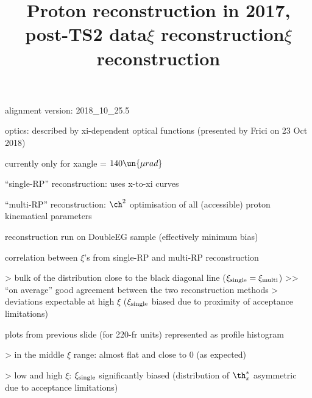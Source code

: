 


\newpage %

\def\author{J.~Kašpar}
\def\caption{Proton reconstruction, 2017, post-TS2}
\def\date{26 Oct 2018}

\newpage %
\title{Proton reconstruction in 2017, post-TS2 data}

\> alignment version: 2018\_10\_25.5

\> optics: described by xi-dependent optical functions (presented by Frici on 23 Oct 2018)

\> currently only for xangle = $140\un{\mu rad}$

\> ``single-RP'' reconstruction: uses x-to-xi curves

\> ``multi-RP'' reconstruction: $\ch^2$ optimisation of all (accessible) proton kinematical parameters

\> reconstruction run on DoubleEG sample (effectively minimum bias)



\newpage %
\title{$\xi$ reconstruction}

\> correlation between $\xi$'s from single-RP and multi-RP reconstruction

\centerline{}

\>> bulk of the distribution close to the black diagonal line ($\xi_{\rm single} = \xi_{\rm multi}$)
\>>> ``on average'' good agreement between the two reconstruction methods
\>> deviations expectable at high $\xi$ ($\xi_{\rm single}$ biased due to proximity of acceptance limitations)


\newpage %
\title{$\xi$ reconstruction}

\> plots from previous slide (for 220-fr units) represented as profile histogram

\centerline{}

\>> in the middle $\xi$ range: almost flat and close to 0 (as expected)

\>> low and high $\xi$: $\xi_{\rm single}$ significantly biased (distribution of $\th^*_x$ asymmetric due to acceptance limitations)



